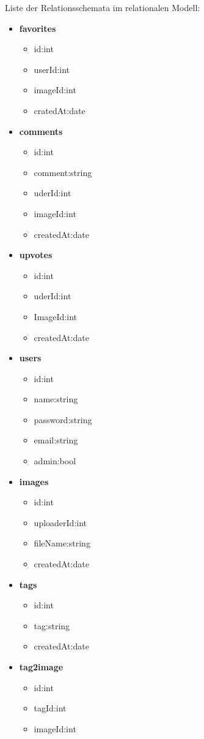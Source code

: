 \documentclass[12pt, oneside, a4paper]{article}		%
\begin{document}
Liste der Relationsschemata im relationalen Modell:

\begin{itemize}
	\item \textbf{favorites}
	\begin{itemize}
		\item id:int
		\item userId:int
		\item imageId:int
		\item cratedAt:date
	\end{itemize}
	\item \textbf{comments}
	\begin{itemize}
		\item id:int
		\item comment:string
		\item uderId:int
		\item imageId:int
		\item createdAt:date
	\end{itemize}
	\item \textbf{upvotes}
	\begin{itemize}
		\item id:int
		\item uderId:int
		\item ImageId:int
		\item createdAt:date
	\end{itemize}
	\item \textbf{users}
	\begin{itemize}
		\item id:int
		\item name:string
		\item password:string
		\item email:string
		\item admin:bool
	\end{itemize}
	\item \textbf{images}
	\begin{itemize}
		\item id:int
		\item uploaderId:int
		\item fileName:string
		\item createdAt:date
	\end{itemize}
	\item \textbf{tags}
	\begin{itemize}
		\item id:int
		\item tag:string
		\item createdAt:date
	\end{itemize}
	\item \textbf{tag2image}
	\begin{itemize}
		\item id:int
		\item tagId:int
		\item imageId:int
	\end{itemize}
\end{itemize}
\end{document}
